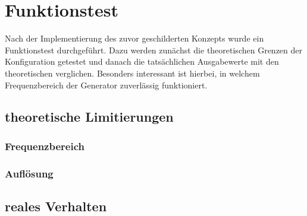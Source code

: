 \chapter{Funktionstest}
Nach der Implementierung des zuvor geschilderten Konzepts wurde ein Funktionstest durchgeführt.
Dazu werden zunächst die theoretischen Grenzen der Konfiguration getestet und danach die tatsächlichen Ausgabewerte mit den theoretischen verglichen.
Besonders interessant ist hierbei, in welchem Frequenzbereich der Generator zuverlässig funktioniert.

\section{theoretische Limitierungen}

\subsection{Frequenzbereich}

\subsection{Auflösung}

\section{reales Verhalten}

